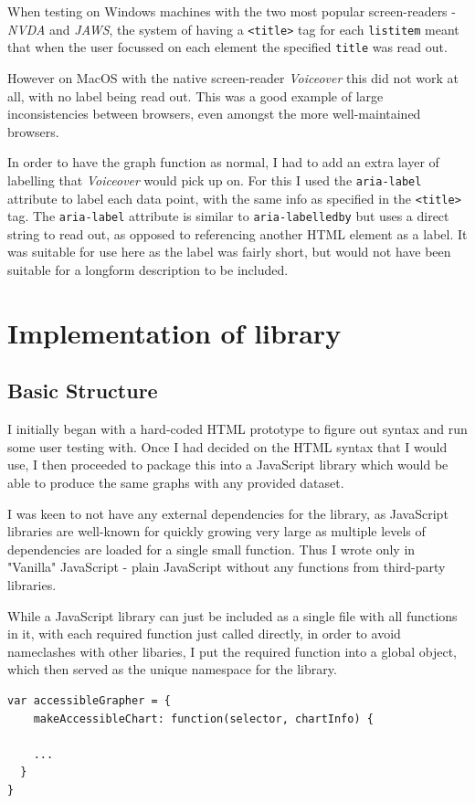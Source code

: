 \documentclass[ %
                    author={Aleena Baig},
                supervisor={Dr Simon Lock},
                    degree={BSc},
                     title={On Making Web Accessible Graphs},
                  subtitle={},
                      year={2019} ]{dissertation}
\begin{document}
When testing on Windows machines with the two most popular screen-readers - \textit{NVDA} and \textit{JAWS}, the system of having a \texttt{<title>} tag for each \texttt{listitem} meant that when the user focussed on each element the specified \texttt{title} was read out.

However on MacOS with the native screen-reader \textit{Voiceover} this did not work at all, with no label being read out. This was a good example of large inconsistencies between browsers, even amongst the more well-maintained browsers.

In order to have the graph function as normal, I had to add an extra layer of labelling that \textit{Voiceover} would pick up on. For this I used the \texttt{aria-label} attribute to label each data point, with the same info as specified in the \texttt{<title>} tag. The \texttt{aria-label} attribute is similar to \texttt{aria-labelledby} but uses a direct string to read out, as opposed to referencing another HTML element as a label. It was suitable for use here as the label was fairly short, but would not have been suitable for a longform description to be included.

\section{Implementation of library}

\subsection{Basic Structure}

I initially began with a hard-coded HTML prototype to figure out syntax and run some user testing with. Once I had decided on the HTML syntax that I would use, I then proceeded to package this into a JavaScript library which would be able to produce the same graphs with any provided dataset.

I was keen to not have any external dependencies for the library, as JavaScript libraries are well-known for quickly growing very large as multiple levels of dependencies are loaded for a single small function. Thus I wrote only in "Vanilla" JavaScript - plain JavaScript without any functions from third-party libraries.

While a JavaScript library can just be included as a single file with all functions in it, with each required function just called directly, in order to avoid nameclashes with other libaries, I put the required function into a global object, which then served as the unique namespace for the library.
\newline
\begin{lstlisting}
var accessibleGrapher = {
    makeAccessibleChart: function(selector, chartInfo) {

    ...
  }
}
\end{lstlisting}
\end{document}
